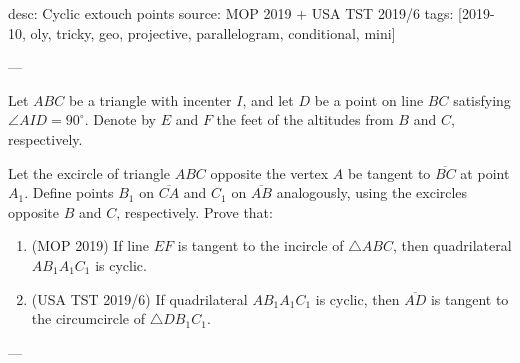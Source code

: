 desc: Cyclic extouch points
source: MOP 2019 $+$ USA TST 2019/6
tags: [2019-10, oly, tricky, geo, projective, parallelogram, conditional, mini]

---

Let $ABC$ be a triangle with incenter $I$, and let $D$ be a point on line $BC$ satisfying $\angle AID=90^\circ$. Denote by $E$ and $F$ the feet of the altitudes from $B$ and $C$, respectively.

Let the excircle of triangle $ABC$ opposite the vertex $A$ be tangent to $\overline{BC}$ at point $A_1$. Define points $B_1$ on $\overline{CA}$ and $C_1$ on $\overline{AB}$ analogously, using the excircles opposite $B$ and $C$, respectively. Prove that:
\begin{enumerate}[label=(\alph*)]
    \item (MOP 2019) If line $EF$ is tangent to the incircle of $\triangle ABC$, then quadrilateral $AB_1A_1C_1$ is cyclic.
    \item (USA TST 2019/6) If quadrilateral $AB_1A_1C_1$ is cyclic, then $\overline{AD}$ is tangent to the circumcircle of $\triangle DB_1C_1$.
\end{enumerate}

---

